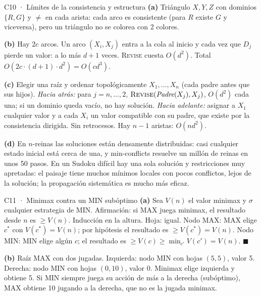 \begin{solucion}{C10 · Límites de la consistencia y estructura}
\textbf{(a)} Triángulo $X,Y,Z$ con dominios $\{R,G\}$ y $\ne$ en cada arista: cada arco es consistente
(para $R$ existe $G$ y viceversa), pero un triángulo no se colorea con 2 colores.

\textbf{(b)} Hay $2c$ arcos. Un arco $(X_i,X_j)$ entra a la cola al inicio y cada vez que $D_j$ pierde un
valor: a lo más $d+1$ veces. \textsc{Revise} cuesta $O(d^2)$. Total $O(2c\cdot(d+1)\cdot d^2)=O(cd^3)$.

\textbf{(c)} Elegir una raíz y ordenar topológicamente $X_1,\dots,X_n$ (cada padre antes que sus hijos).
\emph{Hacia atrás:} para $j=n,\dots,2$, $\textsc{Revise}(\textit{Padre}(X_j),X_j)$, $O(d^2)$ cada una; si un dominio
queda vacío, no hay solución. \emph{Hacia adelante:} asignar a $X_1$ cualquier valor y a cada $X_i$ un valor
compatible con su padre, que existe por la consistencia dirigida. Sin retrocesos. Hay $n-1$ aristas:
$O(nd^2)$.

\textbf{(d)} En $n$-reinas las soluciones están densamente distribuidas: casi cualquier estado inicial
está cerca de una, y min-conflicts resuelve un millón de reinas en unos 50 pasos. En un Sudoku difícil hay
una sola solución y restricciones muy apretadas: el paisaje tiene muchos mínimos locales con pocos
conflictos, lejos de la solución; la propagación sistemática es mucho más eficaz.
\end{solucion}

\begin{solucion}{C11 · Minimax contra un MIN subóptimo}
\textbf{(a)} Sea $V(n)$ el valor minimax y $\sigma$ cualquier estrategia de MIN. Afirmación: si MAX juega
minimax, el resultado desde $n$ es $\ge V(n)$. Inducción en la altura. Hoja: igual. Nodo MAX: MAX elige
$c^*$ con $V(c^*)=V(n)$; por hipótesis el resultado es $\ge V(c^*)=V(n)$. Nodo MIN: MIN elige algún $c$; el
resultado es $\ge V(c)\ge\min_{c'}V(c')=V(n)$. $\blacksquare$

\textbf{(b)} Raíz MAX con dos jugadas. Izquierda: nodo MIN con hojas $(5,5)$, valor 5. Derecha: nodo MIN con
hojas $(0,10)$, valor 0. Minimax elige izquierda y obtiene 5. Si MIN siempre juega su acción de más a la
derecha (subóptimo), MAX obtiene 10 jugando a la derecha, que no es la jugada minimax.
\end{solucion}

